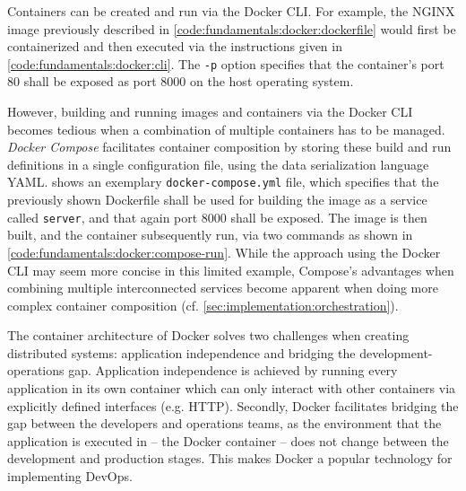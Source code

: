 

Containers can be created and run via the Docker \ac{CLI}.
For example, the NGINX image previously described in \cref{code:fundamentals:docker:dockerfile} would first be containerized and then executed via the instructions given in \cref{code:fundamentals:docker:cli}.
The \texttt{-p} option specifies that the container's port 80 shall be exposed as port 8000 on the host operating system.



However, building and running images and containers via the Docker \ac{CLI} becomes tedious when a combination of multiple containers has to be managed.
\emph{Docker Compose} facilitates container composition by storing these build and run definitions in a single configuration file, using the data serialization language \ac{YAML}.
 shows an exemplary \texttt{docker-compose.yml} file, which specifies that  the previously shown Dockerfile shall be used for building the image as a service called \texttt{server}, and that again port 8000 shall be exposed.
The image is then built, and the container subsequently run, via two commands as shown in \cref{code:fundamentals:docker:compose-run}.
While the approach using the Docker CLI may seem more concise in this limited example, Compose's advantages when combining multiple interconnected services become apparent when doing more complex container composition (cf. \cref{sec:implementation:orchestration}).




The container architecture of Docker solves two challenges when creating distributed systems: application independence and bridging the development-operations gap.
Application independence is achieved by running every application in its own container which can only interact with other containers via explicitly defined interfaces (e.g. HTTP).
Secondly, Docker facilitates bridging the gap between the developers and operations teams, as the environment that the application is executed in -- the Docker container -- does not change between the development and production stages.
This makes Docker a popular technology for implementing DevOps.

